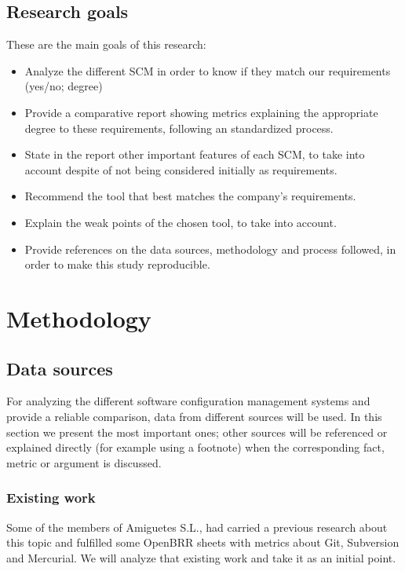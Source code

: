 \documentclass[a4paper,10pt]{article}
\begin{document}
\subsection{Research goals}
These are the main goals of this research:
\begin{itemize}
\item Analyze the different SCM in order to know if they match our requirements
(yes/no; degree)
\item Provide a comparative report showing metrics explaining the appropriate
degree to these requirements, following an standardized process.
\item State in the report other important features of each SCM, to take into
account despite of not being considered initially as requirements.
\item Recommend the tool that best matches the company's requirements.
\item Explain the weak points of the chosen tool, to take into account.
\item Provide references on the data sources, methodology and process followed,
in order to make this study reproducible.
\end{itemize}

\section{Methodology}

\subsection{Data sources}
\label{datasources}
For analyzing the different software configuration management systems and
provide a reliable comparison, data from different sources will be used. In
this section we present the most important ones; other sources will be
referenced or explained directly (for example using a footnote) when the
corresponding fact, metric or argument is discussed.

\subsubsection{Existing work}
\label{Existingwork}
Some of the members of Amiguetes S.L., had carried a previous research about
this topic and fulfilled some OpenBRR sheets with metrics about Git, Subversion
and Mercurial. We will analyze that existing work and take it as an initial
point. 
\end{document}
